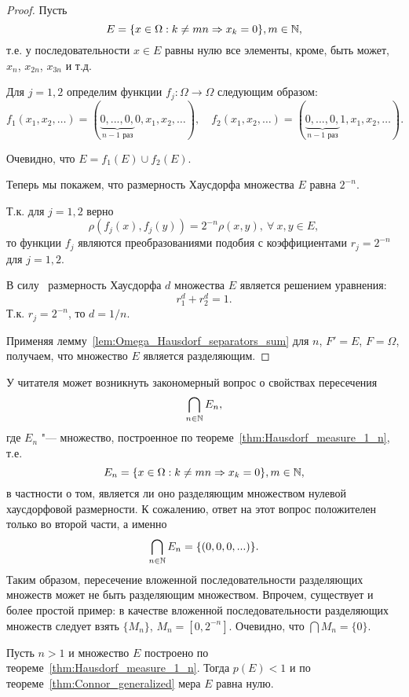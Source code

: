 \begin{proof}
	Пусть
	\begin{equation}
		E= \{ x \in \Omega : k \neq mn \Rightarrow x_k = 0\}, m\in \mathbb{N}
		,
	\end{equation}
	т.е. у последовательности $x \in E$ равны нулю все элементы, кроме, быть может, $x_n$, $x_{2n}$, $x_{3n}$ и т.д.

	Для $j=1,2$ определим функции $f_j : \Omega \to \Omega$ следующим образом:
	\begin{equation}
		f_1(x_1, x_2, \dots)=(\underbrace{0, ..., 0,}_{\mbox{$n-1$ раз}} 0, x_1, x_2, \dots)
		,
		\quad
		f_2(x_1, x_2, \dots)=(\underbrace{0, ..., 0,}_{\mbox{$n-1$ раз}} 1, x_1, x_2, \dots)
		.
	\end{equation}

	Очевидно, что $E=f_1(E)\cup f_2(E).$

	Теперь мы покажем, что размерность Хаусдорфа множества $E$ равна $2^{-n}$.

	Т.к. для $j=1,2$ верно
	 $$\rho(f_j(x),f_j(y))=2^{-n}\rho(x,y), \ \forall \ x, y \in E,$$
	 то функции $f_j$ являются преобразованиями подобия с коэффициентами $r_j=2^{-n}$ для $j=1,2$.


	В силу~\cite[Теорема 9.3]{Edgar} размерность Хаусдорфа $d$ множества $E$ является решением уравнения:
	$$ r_1^d+r_2^d=1.$$
	Т.к. $r_j=2^{-n}$, то
	$d=1/n.$

	Применяя лемму~\ref{lem:Omega_Hausdorf_separators_sum}
	для $n$, $F'=E$, $F=\Omega$, получаем, что множество $E$ является разделяющим.
\end{proof}

\begin{remark}
	У читателя может возникнуть закономерный вопрос о свойствах пересечения
	\begin{equation}
		\bigcap_{n\in \mathbb{N}} E_{n}
		,
	\end{equation}
	где $E_n$ "--- множество, построенное по теореме~\ref{thm:Hausdorf_measure_1_n}, т.е.
	\begin{equation}
		E_n = \{ x \in \Omega : k \neq mn \Rightarrow x_k = 0\}, m\in \mathbb{N}
		,
	\end{equation}
	в частности о том, является ли оно разделяющим множеством нулевой хаусдорфовой размерности.
	К сожалению, ответ на этот вопрос положителен только во второй части, а именно
	\begin{equation}
		\bigcap_{n\in \mathbb{N}} E_n = \{(0,0,0,...)\}
		.
	\end{equation}
	Таким образом, пересечение вложенной последовательности разделяющих множеств может не быть разделяющим множеством.
	Впрочем, существует и более простой пример:
	в качестве вложенной последовательности разделяющих множеств следует взять $\{M_n\}$, $M_n = [0, 2^{-n}]$.
	Очевидно, что $\bigcap\limits M_n = \{0\}$.
\end{remark}


\begin{remark}
	Пусть $n>1$ и множество $E$ построено по теореме~\ref{thm:Hausdorf_measure_1_n}.
	Тогда $p(E)< 1$ и по теореме~\ref{thm:Connor_generalized} мера $E$ равна нулю.
\end{remark}
